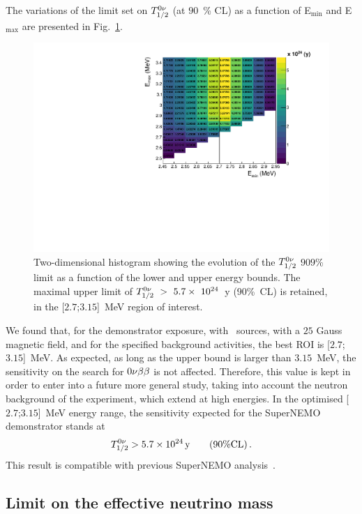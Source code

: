 The variations of the limit set on $T_{1/2}^{0\nu}$ (at $90$~\% CL) as a function of E$_{\text{min}}$ and E$_{\text{max}}$ are presented in Fig.~\ref{fig:sensitivity_cont}.
\begin{figure}[h!]
  \centering
  \includegraphics[width=1.1\textwidth]{Sensitivity/fig_sensitivity/sensitivity_spectrum_with_B_82Se.pdf}
  \caption{Two-dimensional histogram showing the evolution of the $T_{1/2}^{0\nu}$ $909$\% limit as a function of the lower and upper energy bounds.
    The maximal upper limit of $T_{1/2}^{0\nu}~>~5.7\times~10^{24}$~y (90\%~CL) is retained, in the [$2.7$;$3.15$]~MeV region of interest.
    \label{fig:sensitivity_cont}}
\end{figure}
We found that, for the demonstrator exposure, with \Se\ sources, with a $25$ Gauss magnetic field, and for the specified background activities, the best ROI is [$2.7$;$3.15$]~MeV.
As expected, as long as the upper bound is larger than $3.15$~MeV, the sensitivity on the search for $0\nu\beta\beta$ is not affected.
Therefore, this value is kept in order to enter into a future more general study, taking into account the neutron background of the experiment, which extend at high energies.
In the optimised [$2.7$;$3.15$]~MeV energy range, the sensitivity expected for the SuperNEMO demonstrator stands at
\begin{equation}
T_{1/2}^{0\nu} > 5.7\times 10^{24}\,\text{y}\qquad (90\% \text{CL})\,.
\end{equation}
This result is compatible with previous SuperNEMO analysis~\cite{CalvezThesis}.

\subsection{Limit on the effective neutrino mass}


